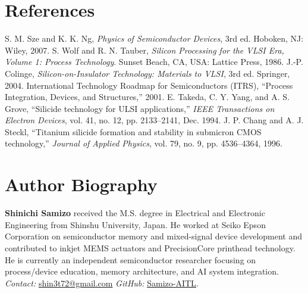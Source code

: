 \documentclass[conference]{IEEEtran}
\begin{document}
\section*{References}
\begin{thebibliography}{99}
 S. M. Sze and K. K. Ng, \textit{Physics of Semiconductor Devices}, 3rd ed. Hoboken, NJ: Wiley, 2007.
 S. Wolf and R. N. Tauber, \textit{Silicon Processing for the VLSI Era, Volume 1: Process Technology}. Sunset Beach, CA, USA: Lattice Press, 1986.
 J.-P. Colinge, \textit{Silicon-on-Insulator Technology: Materials to VLSI}, 3rd ed. Springer, 2004.
 International Technology Roadmap for Semiconductors (ITRS), ``Process Integration, Devices, and Structures,'' 2001.
 E. Takeda, C. Y. Yang, and A. S. Grove, ``Silicide technology for ULSI applications,'' \textit{IEEE Transactions on Electron Devices}, vol. 41, no. 12, pp. 2133--2141, Dec. 1994.
 J. P. Chang and A. J. Steckl, ``Titanium silicide formation and stability in submicron CMOS technology,'' \textit{Journal of Applied Physics}, vol. 79, no. 9, pp. 4536--4364, 1996.
\end{thebibliography}

\section*{Author Biography}
\textbf{Shinichi Samizo} received the M.S. degree in Electrical and Electronic Engineering from Shinshu University, Japan. 
He worked at Seiko Epson Corporation on semiconductor memory and mixed-signal device development and contributed to inkjet MEMS actuators and PrecisionCore printhead technology. 
He is currently an independent semiconductor researcher focusing on process/device education, memory architecture, and AI system integration.\\
\emph{Contact:} \href{mailto:shin3t72@gmail.com}{shin3t72@gmail.com}\quad
\emph{GitHub:} \href{https://github.com/Samizo-AITL}{Samizo-AITL}.
\end{document}
